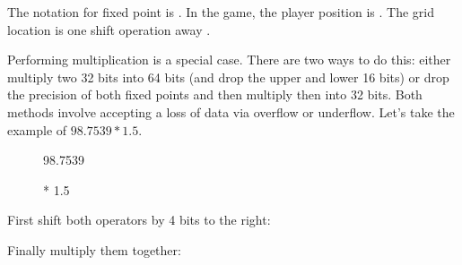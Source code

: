 The notation for fixed point is . In the game, the player position is . The grid location is one shift operation away .\\
\par
Performing multiplication is a special case. There are two ways to do this: either multiply two 32 bits into 64 bits (and drop the upper and lower 16 bits) or drop the precision of both fixed points and then multiply then into 32 bits. Both methods involve accepting a loss of data via overflow or underflow. Let's take the example of $98.7539 * 1.5$.


\par
\begin{figure}[H]
 \centering
   
   \caption{98.7539} 
\end{figure} 
\par
\begin{figure}[H]
 \centering
   
   \caption{* 1.5} 
\end{figure} 
\par
First shift both operators by 4 bits to the right:\\
\par
\begin{figure}[H]
 \centering
   
\end{figure} 
\par
\begin{figure}[H]
 \centering
   
\end{figure} 
\par

Finally multiply them together:

